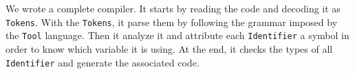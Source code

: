 We wrote a complete compiler. It starts by reading the code and decoding it as \lstinline$Tokens$. With the \lstinline$Tokens$, it parse them by following the grammar imposed by the \lstinline$Tool$ language. Then it analyze it and attribute each \lstinline$Identifier$ a symbol in order to know which variable it is using. At the end, it checks the types of all \lstinline$Identifier$ and generate the associated code.
